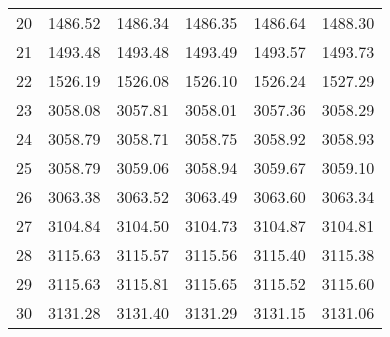 \documentclass[10pt,oneside]{article}
\begin{document}
\begin{table}[h!]
\begin{tabular}{cccccc}
20 &   1486.52 & 1486.34 &    1486.35 & 1486.64 &   1488.30 \\
21 &   1493.48 & 1493.48 &    1493.49 & 1493.57 &   1493.73 \\
22 &   1526.19 & 1526.08 &    1526.10 & 1526.24 &   1527.29 \\
23 &   3058.08 & 3057.81 &    3058.01 & 3057.36 &   3058.29 \\
24 &   3058.79 & 3058.71 &    3058.75 & 3058.92 &   3058.93 \\
25 &   3058.79 & 3059.06 &    3058.94 & 3059.67 &   3059.10 \\
26 &   3063.38 & 3063.52 &    3063.49 & 3063.60 &   3063.34 \\
27 &   3104.84 & 3104.50 &    3104.73 & 3104.87 &   3104.81 \\
28 &   3115.63 & 3115.57 &    3115.56 & 3115.40 &   3115.38 \\
29 &   3115.63 & 3115.81 &    3115.65 & 3115.52 &   3115.60 \\
30 &   3131.28 & 3131.40 &    3131.29 & 3131.15 &   3131.06 \\
\bottomrule
\end{tabular}
\end{table}
\end{document}

